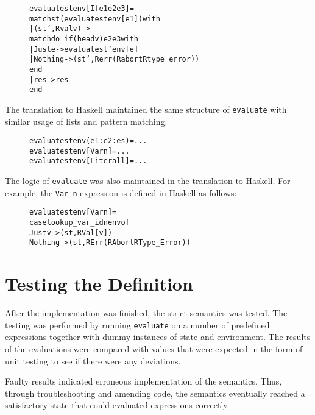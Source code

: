 \begin{figure}[H]
\begin{alltt}
  evaluate st env [If e1 e2 e3] =
    match st (evaluate st env [e1]) with
    | (st', Rval v) ->
        match do_if (head v) e2 e3 with
        | Just e -> evaluate st' env [e]
        | Nothing -> (st', Rerr (Rabort Rtype_error))
        end
    | res -> res
    end
\end{alltt}
\end{figure}

The translation to Haskell maintained the same structure of \texttt{evaluate}
with similar usage of lists and pattern matching.

\begin{figure}[H]
\begin{alltt}
  evaluate st env (e1:e2:es)  = ...
  evaluate st env [Var n]     = ...
  evaluate st env [Literal l] = ...
\end{alltt}
\end{figure}

\noindent The logic of \texttt{evaluate} was also maintained in the translation
to Haskell. For example, the \texttt{Var n} expression is defined in Haskell as
follows:

\begin{figure}[H]
\begin{alltt}
  evaluate st env [Var n] =
    case lookup_var_id n env of
      Just v  -> (st, RVal [v])
      Nothing -> (st, RErr (RAbort RType_Error))
\end{alltt}
\end{figure}

\section{Testing the Definition}

After the implementation was finished, the strict semantics was tested.
The testing was performed by running \texttt{evaluate} on a number of predefined
expressions together with dummy instances of state and environment.
The results of the evaluations were compared with values that were expected
in the form of unit testing to see if there were any deviations. 

Faulty results indicated erroneous implementation of the semantics.
Thus, through troubleshooting and amending code, the semantics eventually
reached a satisfactory state that could evaluated expressions correctly.
